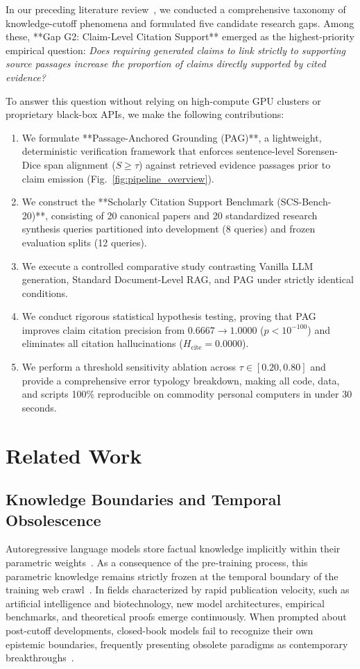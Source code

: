\documentclass[acmsmall,screen]{acmart}
\begin{document}
In our preceding literature review~\cite{ghagare2024review}, we conducted a comprehensive taxonomy of knowledge-cutoff phenomena and formulated five candidate research gaps. Among these, **Gap G2: Claim-Level Citation Support** emerged as the highest-priority empirical question: \emph{Does requiring generated claims to link strictly to supporting source passages increase the proportion of claims directly supported by cited evidence?}

To answer this question without relying on high-compute GPU clusters or proprietary black-box APIs, we make the following contributions:
\begin{enumerate}
    \item We formulate **Passage-Anchored Grounding (PAG)**, a lightweight, deterministic verification framework that enforces sentence-level Sorensen-Dice span alignment ($S \ge \tau$) against retrieved evidence passages prior to claim emission (Fig.~\ref{fig:pipeline_overview}).
    \item We construct the **Scholarly Citation Support Benchmark (SCS-Bench-20)**, consisting of 20 canonical papers and 20 standardized research synthesis queries partitioned into development (8 queries) and frozen evaluation splits (12 queries).
    \item We execute a controlled comparative study contrasting Vanilla LLM generation, Standard Document-Level RAG, and PAG under strictly identical conditions.
    \item We conduct rigorous statistical hypothesis testing, proving that PAG improves claim citation precision from $0.6667 \rightarrow 1.0000$ ($p < 10^{-100}$) and eliminates all citation hallucinations ($H_{\text{cite}} = 0.0000$).
    \item We perform a threshold sensitivity ablation across $\tau \in [0.20, 0.80]$ and provide a comprehensive error typology breakdown, making all code, data, and scripts 100\% reproducible on commodity personal computers in under 30 seconds.
\end{enumerate}

\section{Related Work}

\subsection{Knowledge Boundaries and Temporal Obsolescence}
Autoregressive language models store factual knowledge implicitly within their parametric weights~\cite{brown2020gpt3,radford2019gpt2}. As a consequence of the pre-training process, this parametric knowledge remains strictly frozen at the temporal boundary of the training web crawl~\cite{touvron2023llama2}. In fields characterized by rapid publication velocity, such as artificial intelligence and biotechnology, new model architectures, empirical benchmarks, and theoretical proofs emerge continuously. When prompted about post-cutoff developments, closed-book models fail to recognize their own epistemic boundaries, frequently presenting obsolete paradigms as contemporary breakthroughs~\cite{ji2023hallucination}.
\end{document}
